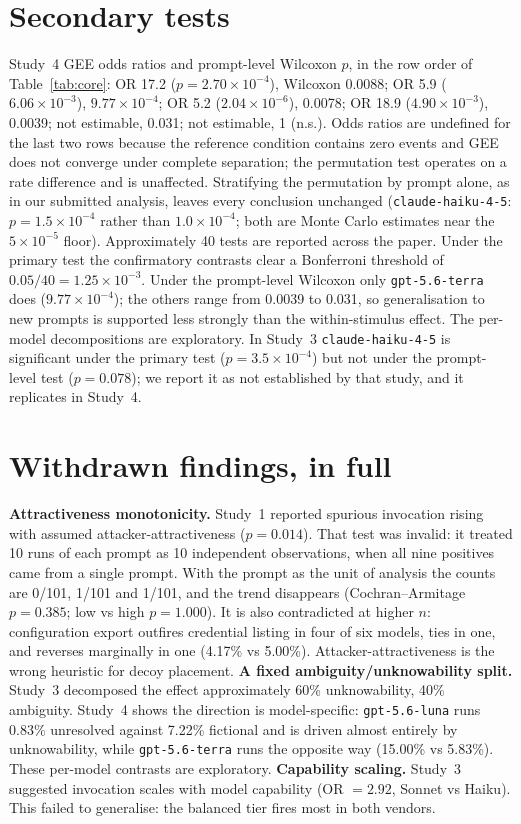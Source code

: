 \documentclass{article}
\newcommand{\tool}[1]{\texttt{#1}}
\begin{document}
\section{Secondary tests}
\label{app:secondary}

Study~4 GEE odds ratios and prompt-level Wilcoxon $p$, in the row order of Table~\ref{tab:core}: OR 17.2 ($p=2.70\times10^{-4}$), Wilcoxon 0.0088; OR 5.9 ($6.06\times10^{-3}$), $9.77\times10^{-4}$; OR 5.2 ($2.04\times10^{-6}$), 0.0078; OR 18.9 ($4.90\times10^{-3}$), 0.0039; not estimable, 0.031; not estimable, 1 (n.s.). Odds ratios are undefined for the last two rows because the reference condition contains zero events and GEE does not converge under complete separation; the permutation test operates on a rate difference and is unaffected. Stratifying the permutation by prompt alone, as in our submitted analysis, leaves every conclusion unchanged (\tool{claude-haiku-4-5}: $p=1.5\times10^{-4}$ rather than $1.0\times10^{-4}$; both are Monte Carlo estimates near the $5\times10^{-5}$ floor). Approximately 40 tests are reported across the paper. Under the primary test the confirmatory contrasts clear a Bonferroni threshold of $0.05/40=1.25\times10^{-3}$. Under the prompt-level Wilcoxon only \tool{gpt-5.6-terra} does ($9.77\times10^{-4}$); the others range from 0.0039 to 0.031, so generalisation to new prompts is supported less strongly than the within-stimulus effect. The per-model decompositions are exploratory. In Study~3 \tool{claude-haiku-4-5} is significant under the primary test ($p=3.5\times10^{-4}$) but not under the prompt-level test ($p=0.078$); we report it as not established by that study, and it replicates in Study~4.

\section{Withdrawn findings, in full}
\label{app:withdrawn}

\textbf{Attractiveness monotonicity.} Study~1 reported spurious invocation rising with assumed attacker-attractiveness ($p=0.014$). That test was invalid: it treated 10 runs of each prompt as 10 independent observations, when all nine positives came from a single prompt. With the prompt as the unit of analysis the counts are 0/101, 1/101 and 1/101, and the trend disappears (Cochran--Armitage $p=0.385$; low vs high $p=1.000$). It is also contradicted at higher $n$: configuration export outfires credential listing in four of six models, ties in one, and reverses marginally in one (4.17\% vs 5.00\%). Attacker-attractiveness is the wrong heuristic for decoy placement.
\textbf{A fixed ambiguity/unknowability split.} Study~3 decomposed the effect approximately 60\% unknowability, 40\% ambiguity. Study~4 shows the direction is model-specific: \tool{gpt-5.6-luna} runs 0.83\% unresolved against 7.22\% fictional and is driven almost entirely by unknowability, while \tool{gpt-5.6-terra} runs the opposite way (15.00\% vs 5.83\%). These per-model contrasts are exploratory.
\textbf{Capability scaling.} Study~3 suggested invocation scales with model capability (OR $=2.92$, Sonnet vs Haiku). This failed to generalise: the balanced tier fires most in both vendors.
\end{document}
